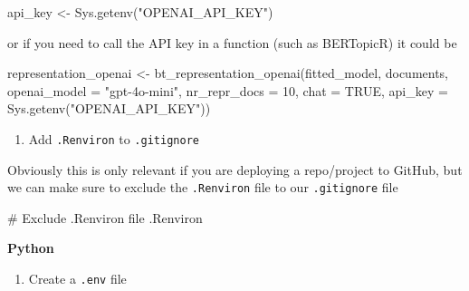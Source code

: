 \documentclass[
  letterpaper,
  DIV=11,
  numbers=noendperiod]{scrreprt}
\newenvironment{Shaded}{\begin{snugshade}}{\end{snugshade}}
\newcommand{\AttributeTok}[1]{\textcolor[rgb]{0.40,0.45,0.13}{#1}}
\newcommand{\CommentTok}[1]{\textcolor[rgb]{0.37,0.37,0.37}{#1}}
\newcommand{\ConstantTok}[1]{\textcolor[rgb]{0.56,0.35,0.01}{#1}}
\newcommand{\DecValTok}[1]{\textcolor[rgb]{0.68,0.00,0.00}{#1}}
\newcommand{\FunctionTok}[1]{\textcolor[rgb]{0.28,0.35,0.67}{#1}}
\newcommand{\NormalTok}[1]{\textcolor[rgb]{0.00,0.23,0.31}{#1}}
\newcommand{\OtherTok}[1]{\textcolor[rgb]{0.00,0.23,0.31}{#1}}
\newcommand{\StringTok}[1]{\textcolor[rgb]{0.13,0.47,0.30}{#1}}
\providecommand{\tightlist}{%
  \setlength{\itemsep}{0pt}\setlength{\parskip}{0pt}}\usepackage{longtable,booktabs,array}
\begin{document}
\begin{Shaded}
\begin{Highlighting}[]
\NormalTok{api\_key }\OtherTok{\textless{}{-}} \FunctionTok{Sys.getenv}\NormalTok{(}\StringTok{"OPENAI\_API\_KEY"}\NormalTok{)}
\end{Highlighting}
\end{Shaded}

or if you need to call the API key in a function (such as BERTopicR) it
could be

\begin{Shaded}
\begin{Highlighting}[]
\NormalTok{representation\_openai }\OtherTok{\textless{}{-}} \FunctionTok{bt\_representation\_openai}\NormalTok{(fitted\_model,}
\NormalTok{                                                  documents,}
                                                  \AttributeTok{openai\_model =} \StringTok{"gpt{-}4o{-}mini"}\NormalTok{,}
                                                  \AttributeTok{nr\_repr\_docs =} \DecValTok{10}\NormalTok{,}
                                                  \AttributeTok{chat =} \ConstantTok{TRUE}\NormalTok{,}
                                                  \AttributeTok{api\_key =} \FunctionTok{Sys.getenv}\NormalTok{(}\StringTok{"OPENAI\_API\_KEY"}\NormalTok{))}
\end{Highlighting}
\end{Shaded}

\begin{enumerate}
\def\labelenumi{\arabic{enumi}.}
\setcounter{enumi}{2}
\tightlist
\item
  Add \texttt{.Renviron} to \texttt{.gitignore}
\end{enumerate}

Obviously this is only relevant if you are deploying a repo/project to
GitHub, but we can make sure to exclude the \texttt{.Renviron} file to
our \texttt{.gitignore} file

\begin{Shaded}
\begin{Highlighting}[]
\CommentTok{\# Exclude .Renviron file}
\NormalTok{.Renviron}
\end{Highlighting}
\end{Shaded}

\textbf{Python}

\begin{enumerate}
\def\labelenumi{\arabic{enumi}.}
\tightlist
\item
  Create a \texttt{.env} file
\end{enumerate}
\end{document}
